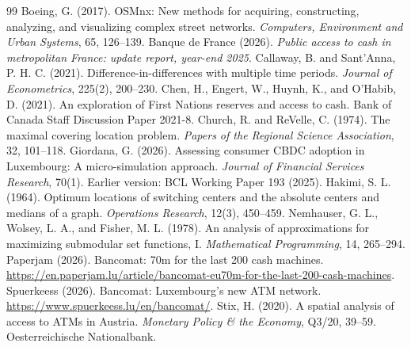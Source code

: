 \documentclass[11pt]{article}
\begin{document}
\begin{thebibliography}{99}
 Boeing, G. (2017). OSMnx: New methods for acquiring, constructing, analyzing, and visualizing complex street networks. \emph{Computers, Environment and Urban Systems}, 65, 126--139.
 Banque de France (2026). \emph{Public access to cash in metropolitan France: update report, year-end 2025}.
 Callaway, B. and Sant'Anna, P. H. C. (2021). Difference-in-differences with multiple time periods. \emph{Journal of Econometrics}, 225(2), 200--230.
 Chen, H., Engert, W., Huynh, K., and O'Habib, D. (2021). An exploration of First Nations reserves and access to cash. Bank of Canada Staff Discussion Paper 2021-8.
 Church, R. and ReVelle, C. (1974). The maximal covering location problem. \emph{Papers of the Regional Science Association}, 32, 101--118.
 Giordana, G. (2026). Assessing consumer CBDC adoption in Luxembourg: A micro-simulation approach. \emph{Journal of Financial Services Research}, 70(1). Earlier version: BCL Working Paper 193 (2025).
 Hakimi, S. L. (1964). Optimum locations of switching centers and the absolute centers and medians of a graph. \emph{Operations Research}, 12(3), 450--459.
 Nemhauser, G. L., Wolsey, L. A., and Fisher, M. L. (1978). An analysis of approximations for maximizing submodular set functions, I. \emph{Mathematical Programming}, 14, 265--294.
 Paperjam (2026). Bancomat: \texteuro70m for the last 200 cash machines. \url{https://en.paperjam.lu/article/bancomat-eu70m-for-the-last-200-cash-machines}.
 Spuerkeess (2026). Bancomat: Luxembourg's new ATM network. \url{https://www.spuerkeess.lu/en/bancomat/}.
 Stix, H. (2020). A spatial analysis of access to ATMs in Austria. \emph{Monetary Policy \& the Economy}, Q3/20, 39--59. Oesterreichische Nationalbank.
\end{thebibliography}
\end{document}
